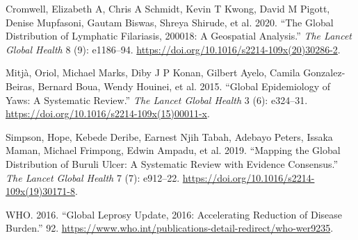 \documentclass[
]{article}
\newlength{\cslhangindent}
\newlength{\cslentryspacingunit} %
\newenvironment{CSLReferences}[2] %
 {%
  \setlength{\parindent}{0pt}
  \ifodd #1
  \let\oldpar\par
  \def\par{\hangindent=\cslhangindent\oldpar}
  \fi
  \setlength{\parskip}{#2\cslentryspacingunit}
 }%
 {}
\begin{document}
\hypertarget{refs}{}
\begin{CSLReferences}{1}{0}
\leavevmode{}%
Cromwell, Elizabeth A, Chris A Schmidt, Kevin T Kwong, David M Pigott, Denise Mupfasoni, Gautam Biswas, Shreya Shirude, et al. 2020. {``The Global Distribution of Lymphatic Filariasis, 2000{\textendash}18: A Geospatial Analysis.''} \emph{The Lancet Global Health} 8 (9): e1186--94. \url{https://doi.org/10.1016/s2214-109x(20)30286-2}.

\leavevmode{}%
Mitjà, Oriol, Michael Marks, Diby J P Konan, Gilbert Ayelo, Camila Gonzalez-Beiras, Bernard Boua, Wendy Houinei, et al. 2015. {``Global Epidemiology of Yaws: A Systematic Review.''} \emph{The Lancet Global Health} 3 (6): e324--31. \url{https://doi.org/10.1016/s2214-109x(15)00011-x}.

\leavevmode{}%
Simpson, Hope, Kebede Deribe, Earnest Njih Tabah, Adebayo Peters, Issaka Maman, Michael Frimpong, Edwin Ampadu, et al. 2019. {``Mapping the Global Distribution of Buruli Ulcer: A Systematic Review with Evidence Consensus.''} \emph{The Lancet Global Health} 7 (7): e912--22. \url{https://doi.org/10.1016/s2214-109x(19)30171-8}.

\leavevmode{}%
WHO. 2016. {``Global Leprosy Update, 2016: Accelerating Reduction of Disease Burden.''} 92. \url{https://www.who.int/publications-detail-redirect/who-wer9235}.

\end{CSLReferences}
\end{document}
